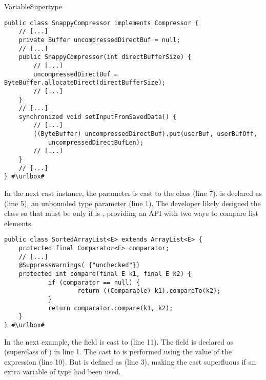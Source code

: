 \begin{pattern}{VariableSupertype}
\def\urlvar{http://bit.ly/facebookarchive_hadoop_20_2FuDeO7}
\begin{verbatim}
public class SnappyCompressor implements Compressor {
    // [...]
    private Buffer uncompressedDirectBuf = null;
    // [...]
    public SnappyCompressor(int directBufferSize) {
        // [...]
        uncompressedDirectBuf = ByteBuffer.allocateDirect(directBufferSize);
        // [...]
    }
    // [...]
    synchronized void setInputFromSavedData() {
        // [...]
        ((ByteBuffer) uncompressedDirectBuf).put(userBuf, userBufOff,
            uncompressedDirectBufLen);
        // [...]
    }
    // [...]
} #\urlbox#
\end{verbatim}

In the next cast instance,%
\def\urlvar{http://bit.ly/oblac_jodd_2UKxm6H}
the parameter  is cast to the  class (line 7).
 is declared as  (line 5), an unbounded type parameter (line 1).
The developer likely designed the class so that
 must be  only if  is ,
providing an API with two ways to compare list elements.

\begin{verbatim}
public class SortedArrayList<E> extends ArrayList<E> {
    protected final Comparator<E> comparator;
    // [...]
    @SuppressWarnings( {"unchecked"})
    protected int compare(final E k1, final E k2) {
            if (comparator == null) {
                    return ((Comparable) k1).compareTo(k2);
            }
            return comparator.compare(k1, k2);
    }
} #\urlbox#
\end{verbatim}

In the next example,%
\def\urlvar{http://bit.ly/tarzanek_luke_2OhDT6O}
the  field is cast to  (line 11).
The  field is declared as  (superclass of ) in line 1.
The cast to  is performed using the value of the expression  (line 10).
But  is defined as  (line 3),
making the cast superfluous if an extra variable of type  had been used.


\end{pattern}
